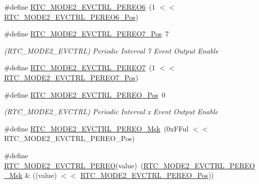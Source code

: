 \begin{DoxyCompactItemize}
\#define \mbox{\hyperlink{group___s_a_m_d21___r_t_c_gaa31f588c6a22301928b408c0d1142336}{R\+T\+C\+\_\+\+M\+O\+D\+E2\+\_\+\+E\+V\+C\+T\+R\+L\+\_\+\+P\+E\+R\+E\+O6}}~(1 $<$$<$ \mbox{\hyperlink{group___s_a_m_d21___r_t_c_ga0c7a0eff7149eaa5e4d0141ad0974cab}{R\+T\+C\+\_\+\+M\+O\+D\+E2\+\_\+\+E\+V\+C\+T\+R\+L\+\_\+\+P\+E\+R\+E\+O6\+\_\+\+Pos}})
\item 
\#define \mbox{\hyperlink{group___s_a_m_d21___r_t_c_ga45a14b5d2d728ce168b10ee6409526ef}{R\+T\+C\+\_\+\+M\+O\+D\+E2\+\_\+\+E\+V\+C\+T\+R\+L\+\_\+\+P\+E\+R\+E\+O7\+\_\+\+Pos}}~7
\begin{DoxyCompactList}\small\item\em (R\+T\+C\+\_\+\+M\+O\+D\+E2\+\_\+\+E\+V\+C\+T\+RL) Periodic Interval 7 Event Output Enable \end{DoxyCompactList}\item 
\#define \mbox{\hyperlink{group___s_a_m_d21___r_t_c_gac825eb3fba6f0f50b2ef5af507cd588d}{R\+T\+C\+\_\+\+M\+O\+D\+E2\+\_\+\+E\+V\+C\+T\+R\+L\+\_\+\+P\+E\+R\+E\+O7}}~(1 $<$$<$ \mbox{\hyperlink{group___s_a_m_d21___r_t_c_ga45a14b5d2d728ce168b10ee6409526ef}{R\+T\+C\+\_\+\+M\+O\+D\+E2\+\_\+\+E\+V\+C\+T\+R\+L\+\_\+\+P\+E\+R\+E\+O7\+\_\+\+Pos}})
\item 
\#define \mbox{\hyperlink{group___s_a_m_d21___r_t_c_gaa39844189777bb350eb746728363f19f}{R\+T\+C\+\_\+\+M\+O\+D\+E2\+\_\+\+E\+V\+C\+T\+R\+L\+\_\+\+P\+E\+R\+E\+O\+\_\+\+Pos}}~0
\begin{DoxyCompactList}\small\item\em (R\+T\+C\+\_\+\+M\+O\+D\+E2\+\_\+\+E\+V\+C\+T\+RL) Periodic Interval x Event Output Enable \end{DoxyCompactList}\item 
\#define \mbox{\hyperlink{group___s_a_m_d21___r_t_c_ga576ec32168ce977d2184b06a3c13f9ab}{R\+T\+C\+\_\+\+M\+O\+D\+E2\+\_\+\+E\+V\+C\+T\+R\+L\+\_\+\+P\+E\+R\+E\+O\+\_\+\+Msk}}~(0x\+F\+Ful $<$$<$ R\+T\+C\+\_\+\+M\+O\+D\+E2\+\_\+\+E\+V\+C\+T\+R\+L\+\_\+\+P\+E\+R\+E\+O\+\_\+\+Pos)
\item 
\#define \mbox{\hyperlink{group___s_a_m_d21___r_t_c_ga0883f9395151820c477a9a085091f544}{R\+T\+C\+\_\+\+M\+O\+D\+E2\+\_\+\+E\+V\+C\+T\+R\+L\+\_\+\+P\+E\+R\+EO}}(value)~(\mbox{\hyperlink{group___s_a_m_d21___r_t_c_ga576ec32168ce977d2184b06a3c13f9ab}{R\+T\+C\+\_\+\+M\+O\+D\+E2\+\_\+\+E\+V\+C\+T\+R\+L\+\_\+\+P\+E\+R\+E\+O\+\_\+\+Msk}} \& ((value) $<$$<$ \mbox{\hyperlink{group___s_a_m_d21___r_t_c_gaa39844189777bb350eb746728363f19f}{R\+T\+C\+\_\+\+M\+O\+D\+E2\+\_\+\+E\+V\+C\+T\+R\+L\+\_\+\+P\+E\+R\+E\+O\+\_\+\+Pos}}))
\item 

\end{DoxyCompactItemize}
